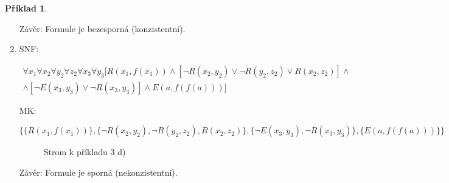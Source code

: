 \documentclass[a4paper]{article}
\theoremstyle{definition}
\newtheorem{priklad}{Příklad}
\begin{document}
\begin{priklad}
\begin{enumerate}
        Závěr: Formule je bezesporná (konzistentní).

        \item SNF:

        {\setlength{\mathindent}{0cm}
        \setlength\abovedisplayskip{-1.5em}
        \begin{multline*}
        \forall x_1\forall x_2\forall y_2\forall z_2\forall x_3\forall y_3[R(x_1,f(x_1))\wedge [\neg R(x_2,y_2)\vee \neg R(y_2,z_2)\vee R(x_2,z_2)]\wedge \\\wedge[\neg E(x_3,y_3)\vee\neg R(x_3,y_3)]\wedge E(a,f(f(a)))]
        \end{multline*}
        }

        MK:

        $ \{ \{R(x_1,f(x_1))\}, \{\neg R(x_2,y_2), \neg R(y_2,z_2), R(x_2,z_2)\},\{\neg E(x_3,y_3),\neg R(x_3,y_3)\},\{E(a,f(f(a)))\} \} $

        \begin{figure}[htbp]
            \centering
            
            \caption{Strom k příkladu 3 d)}
        \end{figure}

        Závěr: Formule je sporná (nekonzistentní).
    \end{enumerate}
\end{priklad}
\end{document}
